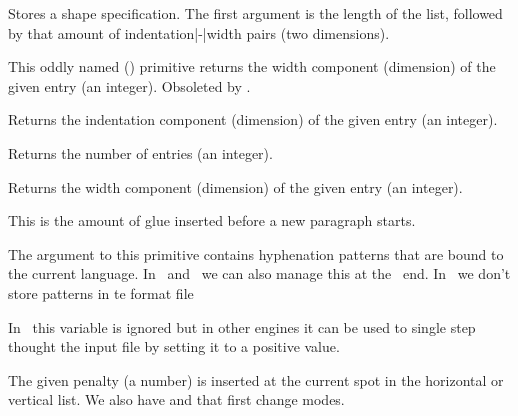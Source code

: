 Stores a shape specification. The first argument is the length of the list,
followed by that amount of indentation|-|width pairs (two dimensions).

\stopoldprimitive

\startoldprimitive[title={\prm {parshapedimen}}]

This oddly named (\ETEX) primitive returns the width component (dimension) of the
given entry (an integer). Obsoleted by .

\stopoldprimitive

\startoldprimitive[title={\prm {parshapeindent}}]

Returns the indentation component (dimension) of the given entry (an integer).

\stopoldprimitive

\startoldprimitive[title={\prm {parshapelength}}]

Returns the number of entries (an integer).

\stopoldprimitive

\startnewprimitive[title={\prm {parshapewidth}}]

Returns the width component (dimension) of the given entry (an integer).

\stopnewprimitive

\startoldprimitive[title={\prm {parskip}}]

This is the amount of glue inserted before a new paragraph starts.

\stopoldprimitive

\startoldprimitive[title={\prm {patterns}}]

The argument to this primitive contains hyphenation patterns that are bound to
the current language. In \LUATEX\ and \LUAMETATEX\ we can also manage this at the
\LUA\ end. In \LUAMETATEX\ we don't store patterns in te format file

\stopoldprimitive

\startoldprimitive[title={\prm {pausing}}][obsolete=yes]

In \LUAMETATEX\ this variable is ignored but in other engines it can be used to
single step thought the input file by setting it to a positive value.

\stopoldprimitive

\startoldprimitive[title={\prm {penalty}}]

The given penalty (a number) is inserted at the current spot in the horizontal or
vertical list. We also have  and  that first change
modes.


